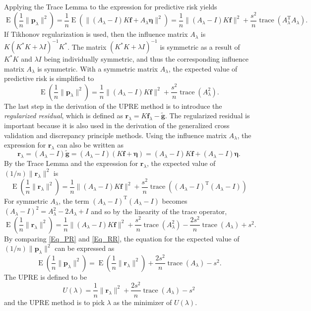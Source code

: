 \documentclass[12pt]{article}
\newcommand{\gnoise}{\widetilde{\mathbf{g}}}
\newcommand{\kmat}{K}	%
\newcommand{\fdis}{\mathbf{f}}
\newcommand{\trans}{\mathrm{T}}	%
\newcommand{\ctrans}{*}	%
\newcommand{\trace}{\operatorname{trace}}	%
\newcommand{\regparam}{\lambda}
\newcommand{\freg}{\fdis_{\regparam}}	%
\newcommand{\SD}{s}	%
\newcommand{\noise}{\bm{\eta}}	%
\newcommand{\E}{\operatorname{E}}	%
\newcommand{\PE}{\mathbf{p}_{\regparam}}	%
\newcommand{\regres}{\mathbf{r}_{\regparam}}	%
\newcommand{\A}{A_{\regparam}}	%
\newcommand{\U}{U}	%
\begin{document}
\noindent Applying the Trace Lemma to the expression for predictive risk yields
\[\E\left(\frac{1}{n}\|\PE\|^2\right) = \frac{1}{n}\E\left(\|(\A-I)\kmat\fdis + \A\noise\|^2\right) = \frac{1}{n}\|(\A-I)\kmat\fdis\|^2 + \frac{\SD^2}{n}\trace({\A^\trans}\A).\]
If Tikhonov regularization is used, then the influence matrix $\A$ is $\kmat(\kmat^\ctrans\kmat + \regparam{I})^{-1}\kmat^\ctrans$. The matrix $(\kmat^\ctrans\kmat + \regparam{I})^{-1}$ is symmetric as a result of $\kmat^\ctrans\kmat$ and $\regparam{I}$ being individually symmetric, and thus the corresponding influence matrix $\A$ is symmetric.  With a symmetric matrix $\A$, the expected value of predictive risk is simplified to
\begin{equation}
\label{Eq_PR}
\E\left(\frac{1}{n}\|\PE\|^2\right) = \frac{1}{n}\|(\A-I)\kmat\fdis\|^2 + \frac{\SD^2}{n}\trace(\A^2).
\end{equation}
\indent The last step in the derivation of the UPRE method is to introduce the \textit{regularized residual}, which is defined as $\regres = \kmat\freg - \gnoise$. The regularized residual is important because it is also used in the derivation of the generalized cross validation and discrepancy principle methods. Using the influence matrix $\A$, the expression for $\regres$ can also be written as
\[\regres = (\A-I)\gnoise = (\A-I)(\kmat\fdis + \noise) = (\A-I)\kmat\fdis + (\A-I)\noise.\]
By the Trace Lemma and the expression for $\regres$, the expected value of $(1/n)\|\regres\|^2$ is
\[\E\left(\frac{1}{n}\|\regres\|^2\right) = \frac{1}{n}\|(\A-I)\kmat\fdis\|^2 + \frac{\SD^2}{n}\trace({(\A-I)^\trans}(\A-I))\]
For symmetric $\A$, the term $(\A-I)^\trans(\A-I)$ becomes $(\A-I)^2 = \A^2 - 2\A + I$ and so by the linearity of the trace operator,
\begin{equation}
\label{Eq_RR}
\E\left(\frac{1}{n}\|\regres\|^2\right) = \frac{1}{n}\|(\A-I)\kmat\fdis\|^2 + \frac{\SD^2}{n}\trace(\A^2) - \frac{2\SD^2}{n}\trace(\A) + \SD^2.
\end{equation}
By comparing \eqref{Eq_PR} and \eqref{Eq_RR}, the equation for the expected value of $(1/n)\|\PE\|^2$ can be expressed as
\[\E\left(\frac{1}{n}\|\PE\|^2\right) = \E\left(\frac{1}{n}\|\regres\|^2\right) + \frac{2\SD^2}{n}\trace(\A) - \SD^2.\]
The UPRE is defined to be
\begin{equation}
\label{Eq_UPRE}
\U(\regparam) = \frac{1}{n}\|\regres\|^2 + \frac{2\SD^2}{n}\trace(\A) - \SD^2
\end{equation}
and the UPRE method is to pick $\regparam$ as the minimizer of $\U(\regparam)$. \par 
\end{document}
